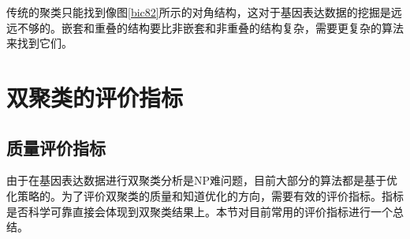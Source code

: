   传统的聚类只能找到像图\ref{bic82}所示的对角结构，这对于基因表达数据的挖掘是远远不够的。嵌套和重叠的结构要比非嵌套和非重叠的结构复杂，需要更复杂的算法来找到它们。

  
\section{双聚类的评价指标}
  \subsection{质量评价指标}\label{section:qualityEval}
  由于在基因表达数据进行双聚类分析是NP难问题，目前大部分的算法都是基于优化策略的。为了评价双聚类的质量和知道优化的方向，需要有效的评价指标。指标是否科学可靠直接会体现到双聚类结果上。本节对目前常用的评价指标进行一个总结。
  
